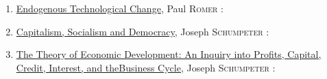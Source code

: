 \begin{enumerate}
	\item \underline{Endogenous Technological Change}, Paul \textsc{Romer} :  
	\item \underline{Capitalism, Socialism and Democracy}, Joseph \textsc{Schumpeter} : 
	\item \underline{The Theory of Economic Development: An Inquiry into Profits, Capital, Credit, Interest, and the}\newline \underline{Business Cycle}, Joseph \textsc{Schumpeter} :
\end{enumerate}